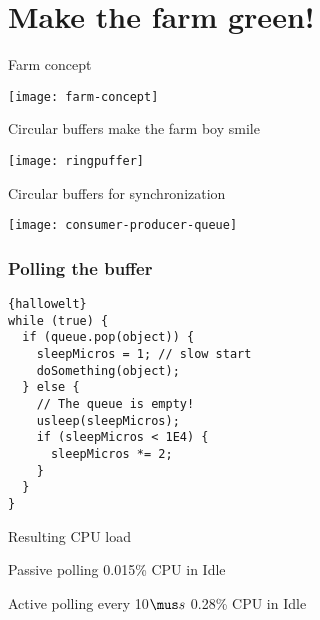 \section{Make the farm green!}
\begin{frame}{Farm concept}{}
	\begin{center} 
		\texttt{[image: farm-concept]}
	\end{center} 
\end{frame}

\begin{frame}{Circular buffers make the farm boy smile}{}
	\begin{center} 
		\texttt{[image: ringpuffer]}
	\end{center} 
\end{frame}

\begin{frame}{Circular buffers for synchronization}{}
	\begin{center} 
		\texttt{[image: consumer-producer-queue]}
	\end{center} 
\end{frame}

\begin{frame}[fragile]
\frametitle{Polling the buffer}
\begin{lstlisting}[frame=trBL,caption={}]{hallowelt}
while (true) {
  if (queue.pop(object)) {
    sleepMicros = 1; // slow start
    doSomething(object);
  } else {
    // The queue is empty! 
    usleep(sleepMicros);
    if (sleepMicros < 1E4) {
      sleepMicros *= 2;
    }
  }
}			
\end{lstlisting}
\end{frame}

\begin{frame}{Resulting CPU load}{}
	\begin{block}{Passive polling} 
		0.015\% CPU in Idle
	\end{block} 
	
		\begin{block}{Active polling every 10$\mus s$} 
		0.28\% CPU in Idle
	\end{block} 
\end{frame}